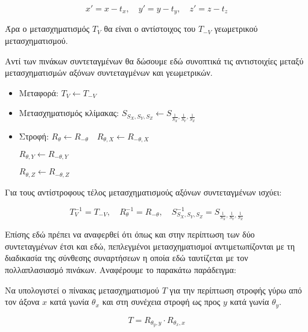 \[
x' = x - t_x, \quad y' = y - t_y, \quad z' = z - t_z
\]

Άρα ο μετασχηματισμός \( T_V \) θα είναι ο αντίστοιχος του \( T_{-V} \) γεωμετρικού μετασχηματισμού.

Αντί των πινάκων συντεταγμένων θα δώσουμε εδώ συνοπτικά τις αντιστοιχίες μεταξύ μετασχηματισμών αξόνων συντεταγμένων και γεωμετρικών.

\begin{itemize}
    \item Μεταφορά:  
    \( T_V \leftarrow T_{-V} \)

    \item Μετασχηματισμός κλίμακας:  
    \( S_{S_X,S_Y,S_Z} \leftarrow S_{\frac{1}{S_X}, \frac{1}{S_Y}, \frac{1}{S_Z}} \)

    \item Στροφή:  
    \( R_{\theta} \leftarrow R_{-\theta} \quad R_{\theta,X} \leftarrow R_{-\theta,X} \)

    \( R_{\theta,Y} \leftarrow R_{-\theta,Y} \)

    \( R_{\theta,Z} \leftarrow R_{-\theta,Z} \)
\end{itemize}

Για τους αντίστροφους τέλος μετασχηματισμούς αξόνων συντεταγμένων ισχύει:

\[
T^{-1}_{V} = T_{-V}, \quad R^{-1}_{\theta} = R_{-\theta}, \quad S^{-1}_{S_X,S_Y,S_Z} = S_{\frac{1}{S_X}, \frac{1}{S_Y}, \frac{1}{S_Z}}
\]

 
Επίσης εδώ πρέπει να αναφερθεί ότι όπως και στην περίπτωση των δύο συντεταγμένων έτσι και εδώ, πεπλεγμένοι μετασχηματισμοί αντιμετωπίζονται με τη διαδικασία της σύνθεσης συναρτήσεων η οποία εδώ ταυτίζεται με τον πολλαπλασιασμό πινάκων. Αναφέρουμε το παρακάτω παράδειγμα:

Να υπολογιστεί ο πίνακας μετασχηματισμού \( T \) για την περίπτωση στροφής γύρω από τον άξονα \( x \) κατά γωνία \( \theta_x \) και στη συνέχεια στροφή ως προς \( y \) κατά γωνία \( \theta_y \).

\[
T = R_{\theta_y, y} \cdot R_{\theta_x, x}
\]

